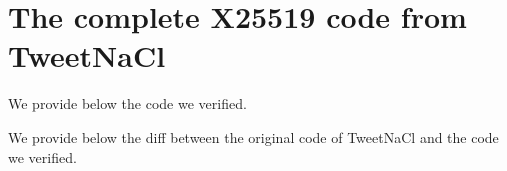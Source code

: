 \section{The complete X25519 code from TweetNaCl}
\label{verified-C-and-diff}

 We provide below the code we verified.



 We provide below the diff between the original code of TweetNaCl and the code we verified.


